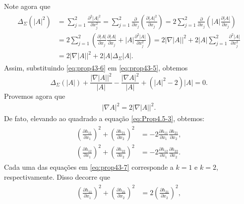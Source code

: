 \begin{demonstracao}
\begin{equation}
\end{equation}
Note agora que
\begin{eqnarray}\label{eq:prop43-6}
\begin{aligned}
\Delta_{\Sigma} (|A|^2) &= \sum_{j=1}^2 \frac{\partial^2 |A|^2}{\partial x_j^2}
= \sum_{j=1}^2 \frac{\partial}{\partial x_j} 
\left( \frac{\partial |A|^2}{\partial x_j} \right) =
2\sum_{j=1}^2\frac{\partial}{\partial x_j}\left(|A|
\frac{\partial|A|}{\partial x_j}\right) \\
&= 
2\sum_{j=1}^2\left(\frac{\partial|A|}{\partial x_j}\frac{\partial|A|}{\partial x_j}
+|A|\frac{\partial^2 |A|}{\partial x_j^2} \right) =
2|\nabla|A||^2+2|A|\sum_{j=1}^2\frac{\partial^2 |A|}{\partial x_j^2} \\
&= 2|\nabla|A||^2+2|A|\Delta_\Sigma|A|.
\end{aligned}
\end{eqnarray}	
Assim, substituindo \eqref{eq:prop43-6} em \eqref{eq:prop43-5},
obtemos
\begin{equation}\label{edp_sff}
\Delta_{\Sigma} (|A|) + \frac{|\nabla |A||^2}{|A|} - \frac{|\nabla A|^2}{|A|} + 
(|A|^2 - 2) |A| = 0.
\end{equation}	
Provemos agora que
\begin{eqnarray} \label{eq:prop43-14}
|\nabla A|^2 = 2|\nabla|A||^2.
\end{eqnarray}
De fato, elevando ao quadrado a equa\c c\~ao \eqref{eq:Prop4.5-3}, 
obtemos:
\begin{eqnarray} \label{eq:prop43-7}
\begin{aligned}
\left( \frac{\partial h_{11}}{\partial x_1} \right)^2 + \left( \frac{\partial h_{21}}{\partial x_2} \right)^2  &= - 2 \frac{\partial h_{11}}{\partial x_1} \frac{\partial h_{21}}{\partial x_2},  \\
\left( \frac{\partial h_{12}}{\partial x_1} \right)^2 + \left( \frac{\partial h_{22}}{\partial x_2} \right)^2 &= - 2 \frac{\partial h_{12}}{\partial x_1} \frac{\partial h_{22}}{\partial x_2}.
\end{aligned}
\end{eqnarray}	
Cada uma das equa\c c\~oes em \eqref{eq:prop43-7} corresponde
a $k=1$ e $k=2$, respectivamente. Disso decorre que
\begin{eqnarray} \label{eq:prop43-8}
\begin{aligned}
\left( \frac{\partial h_{11}}{\partial x_1} \right)^2 + \left( \frac{\partial h_{21}}{\partial x_2} \right)^2  &=  2  \left( \frac{\partial h_{21}}{\partial x_2} \right)^2,  \\

\end{aligned}
\end{eqnarray}
\end{demonstracao}
